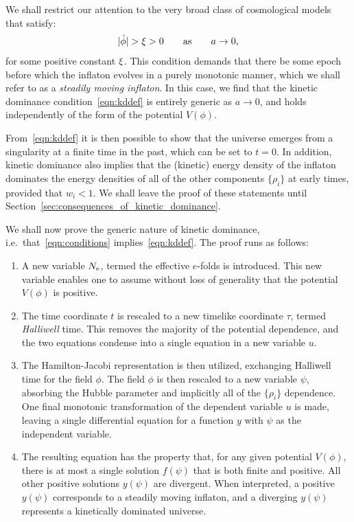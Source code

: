 We shall restrict our attention to the very broad class of cosmological models that satisfy:
\begin{equation}
|\dot{\phi}| > \xi > 0 \qquad \text{as} \qquad a\to 0, 
\label{eqn:conditions}
\end{equation}
for some positive constant \(\xi\).  This condition demands that there be some epoch before which the inflaton evolves in a purely monotonic manner, which we shall refer to as a {\em steadily moving inflaton}. In this case, we find that the kinetic dominance condition~\eqref{eqn:kddef} is entirely generic as \(a \to 0\), and holds independently of the form of the potential \(V(\phi)\).

From~\eqref{eqn:kddef} it is then possible to show that the universe emerges from a singularity at a finite time in the past, which can be set to \(t=0\). In addition, kinetic dominance also implies that the (kinetic) energy density of the inflaton dominates the energy densities of all of the other components \(\{\rho_i\}\) at early times, provided that \(w_i<1\). We shall leave the proof of these statements until Section~\ref{sec:consequences_of_kinetic_dominance}. 

We shall now prove the generic nature of kinetic dominance, i.e.\ that~\eqref{eqn:conditions} implies~\eqref{eqn:kddef}. The proof runs as follows:
\renewcommand{\theenumi}{\Alph{enumi}}
\begin{enumerate}
  \item                                        
    A new variable \(N_\mathrm{e}\), termed the effective \(e\)-folds is introduced. This new variable enables one to assume without loss of generality that the potential \(V(\phi)\) is positive.
  \item
    The time coordinate \(t\) is rescaled to a new timelike coordinate \(\tau\), termed {\em Halliwell\/} time. This removes the majority of the potential dependence, and the two equations condense into a single equation in a new variable \(u\).
  \item
    The Hamilton-Jacobi representation is then utilized, exchanging Halliwell time for the field \(\phi\). The field \(\phi\) is then rescaled to a new variable \(\psi\), absorbing the Hubble parameter and implicitly all of the \(\{\rho_i\}\) dependence. One final monotonic transformation of the dependent variable \(u\) is made, leaving a single differential equation for a function \(y\) with \(\psi\) as the independent variable.
  \item
    The resulting equation has the property that, for any given potential \(V(\phi)\), there is at most a single solution \(f(\psi)\) that is both finite and positive. All other positive solutions \(y(\psi)\) are divergent.  When interpreted, a positive \(y(\psi)\) corresponds to a steadily moving inflaton, and a diverging \(y(\psi)\) represents a kinetically dominated universe.
\end{enumerate}



